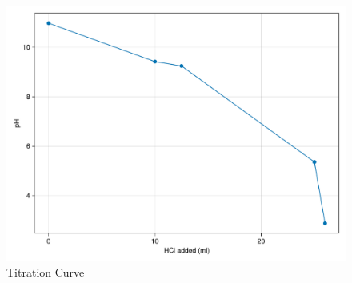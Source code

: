 \documentclass[a4paper, british]{article}
\begin{document}
\begin{appendices}
    \begin{figure}[htb]
        \centering
        \includegraphics[width=\textwidth]{figures/curve.pdf}
        \caption{Titration Curve}
        \label{fig:curve}
    \end{figure}
    
\end{appendices}
\end{document}
